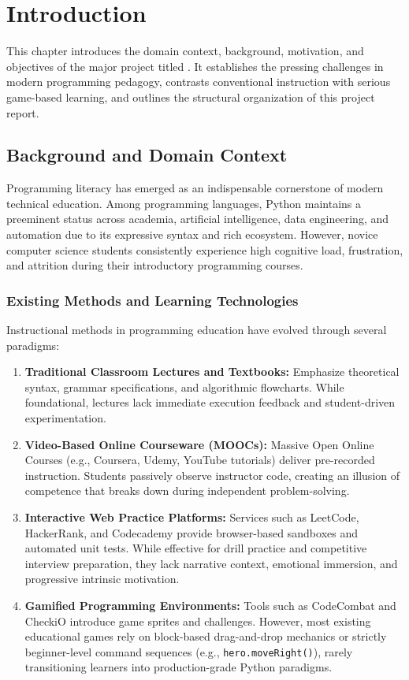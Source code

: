 \chapter{Introduction}
\label{ch:intro}

This chapter introduces the domain context, background, motivation, and objectives of the major project titled \textbf{\ProjectTitle}. It establishes the pressing challenges in modern programming pedagogy, contrasts conventional instruction with serious game-based learning, and outlines the structural organization of this project report.

\section{Background and Domain Context}
Programming literacy has emerged as an indispensable cornerstone of modern technical education. Among programming languages, Python maintains a preeminent status across academia, artificial intelligence, data engineering, and automation due to its expressive syntax and rich ecosystem. However, novice computer science students consistently experience high cognitive load, frustration, and attrition during their introductory programming courses.

\subsection{Existing Methods and Learning Technologies}
Instructional methods in programming education have evolved through several paradigms:
\begin{enumerate}
    \item \textbf{Traditional Classroom Lectures and Textbooks:} Emphasize theoretical syntax, grammar specifications, and algorithmic flowcharts. While foundational, lectures lack immediate execution feedback and student-driven experimentation.
    \item \textbf{Video-Based Online Courseware (MOOCs):} Massive Open Online Courses (e.g., Coursera, Udemy, YouTube tutorials) deliver pre-recorded instruction. Students passively observe instructor code, creating an illusion of competence that breaks down during independent problem-solving.
    \item \textbf{Interactive Web Practice Platforms:} Services such as LeetCode, HackerRank, and Codecademy provide browser-based sandboxes and automated unit tests. While effective for drill practice and competitive interview preparation, they lack narrative context, emotional immersion, and progressive intrinsic motivation.
    \item \textbf{Gamified Programming Environments:} Tools such as CodeCombat and CheckiO introduce game sprites and challenges. However, most existing educational games rely on block-based drag-and-drop mechanics or strictly beginner-level command sequences (e.g., \texttt{hero.moveRight()}), rarely transitioning learners into production-grade Python paradigms.
\end{enumerate}


